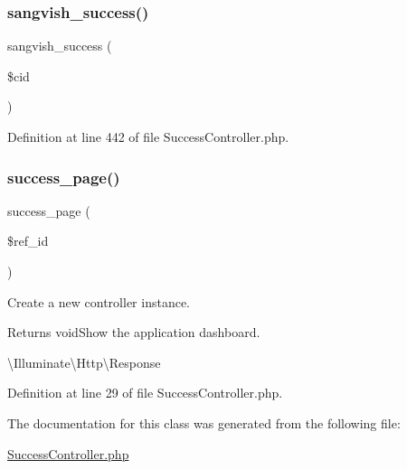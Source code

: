 \subsubsection{\texorpdfstring{sangvish\_success()}{sangvish\_success()}}
{\footnotesize\ttfamily sangvish\+\_\+success (\begin{DoxyParamCaption}\item[{}]{\$cid }\end{DoxyParamCaption})}



Definition at line 442 of file Success\+Controller.\+php.

\mbox{\label{class_responsive_1_1_http_1_1_controllers_1_1_success_controller_aff08e6d23e1e359171985625ca1d6b47}} 
\subsubsection{\texorpdfstring{success\_page()}{success\_page()}}
{\footnotesize\ttfamily success\+\_\+page (\begin{DoxyParamCaption}\item[{}]{\$ref\+\_\+id }\end{DoxyParamCaption})}

Create a new controller instance.

\begin{DoxyReturn}{Returns}
void\+Show the application dashboard.

\textbackslash{}\+Illuminate\textbackslash{}\+Http\textbackslash{}\+Response 
\end{DoxyReturn}


Definition at line 29 of file Success\+Controller.\+php.



The documentation for this class was generated from the following file\+:\begin{DoxyCompactItemize}
\item 
\mbox{\hyperlink{_success_controller_8php}{Success\+Controller.\+php}}\end{DoxyCompactItemize}
